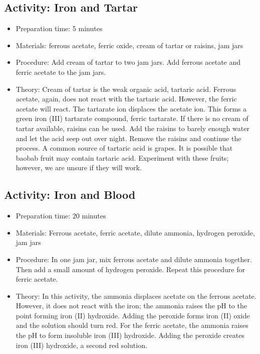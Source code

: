 \begin{itemize}
{\begin{itemize}
\begin{itemize}
{\subsection{Activity: Iron and Tartar}
\begin{itemize}
\item{Preparation time: 5 minutes}
\item{Materials: ferrous acetate, ferric oxide, cream of tartar or raisins, jam jars}
\item{Procedure: Add cream of tartar to two jam jars. Add ferrous acetate and ferric acetate to the jam jars.}
\item{Theory: Cream of tartar is the weak organic acid, tartaric acid. Ferrous acetate, again, does not react with the tartaric acid. However, the ferric acetate will react. The tartarate ion displaces the acetate ion. This forms a green iron (III) tartarate compound, ferric tartarate. If there is no cream of tartar available, raisins can be used. Add the raisins to barely enough water and let the acid seep out over night. Remove the raisins and continue the process. A common source of tartaric acid is grapes. It is possible that baobab fruit may contain tartaric acid. Experiment with these fruits; however, we are unsure if they will work.}
\end{itemize}

\subsection{Activity: Iron and Blood}
\begin{itemize}
\item{Preparation time: 20 minutes}
\item{Materials: Ferrous acetate, ferric acetate, dilute ammonia, hydrogen peroxide, jam jars}
\item{Procedure: In one jam jar, mix ferrous acetate and dilute ammonia together. Then add a small amount of hydrogen peroxide. Repeat this procedure for ferric acetate.}
\item{Theory: In this activity, the ammonia displaces acetate on the ferrous acetate. However, it does not react with the iron; the ammonia raises the pH to the point forming iron (II) hydroxide. Adding the peroxide forms iron (II) oxide and the solution should turn red. For the ferric acetate, the ammonia raises the pH to form insoluble iron (III) hydroxide. Adding the peroxide creates iron (III) hydroxide, a second red solution.}
\end{itemize}

}
\end{itemize}
\end{itemize}}
\end{itemize}
